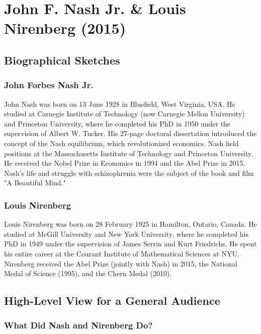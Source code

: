 \chapter{John F. Nash Jr. \& Louis Nirenberg (2015)}

\section{Biographical Sketches}



\subsection{John Forbes Nash Jr.}

John Nash was born on 13 June 1928 in Bluefield, West Virginia, USA. He studied at Carnegie Institute of Technology (now Carnegie Mellon University) and Princeton University, where he completed his PhD in 1950 under the supervision of Albert W. Tucker. His 27-page doctoral dissertation introduced the concept of the Nash equilibrium, which revolutionized economics. Nash held positions at the Massachusetts Institute of Technology and Princeton University. He received the Nobel Prize in Economics in 1994 and the Abel Prize in 2015. Nash's life and struggle with schizophrenia were the subject of the book and film "A Beautiful Mind."

\subsection{Louis Nirenberg}

Louis Nirenberg was born on 28 February 1925 in Hamilton, Ontario, Canada. He studied at McGill University and New York University, where he completed his PhD in 1949 under the supervision of James Serrin and Kurt Friedrichs. He spent his entire career at the Courant Institute of Mathematical Sciences at NYU. Nirenberg received the Abel Prize (jointly with Nash) in 2015, the National Medal of Science (1995), and the Chern Medal (2010).

\section{High-Level View for a General Audience}

\subsection{What Did Nash and Nirenberg Do?}

